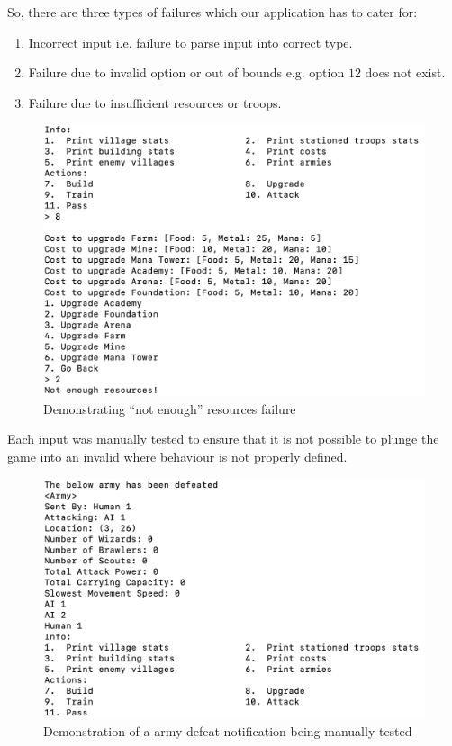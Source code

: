 \documentclass[12pt]{article}
\begin{document}
So, there are three types of failures which our application has
to cater for:

\begin{enumerate}
    \item Incorrect input i.e. failure to parse input into
        correct type.
    \item Failure due to invalid option or out of bounds e.g.
        option $12$ does not exist.
    \item Failure due to insufficient resources or troops.
\end{enumerate}

\begin{figure}[H]
    \centering
    \includegraphics[width=17cm]{./images/not-enough-resources-village-war-game.png}
    \caption{Demonstrating ``not enough'' resources failure}
\end{figure}

Each input was manually tested to ensure that it is not possible
to plunge the game into an invalid where behaviour is not
properly defined.

\begin{figure}[H]
    \centering
    \includegraphics[width=17cm]{./images/testing-army-defeat-village-war-game.png}
    \caption{Demonstration of a army defeat notification being manually tested}
\end{figure}
\end{document}
